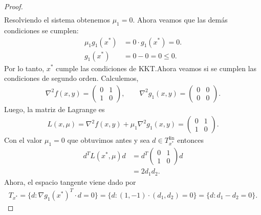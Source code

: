 \documentclass{article}
\begin{document}
\begin{proof}
\begin{align*}
    \end{align*}
    Resolviendo el sistema obtenemos \( \mu_1 = 0 \). Ahora veamos que las demás condiciones se cumplen: \begin{align*}
        \mu_1 g_1(x^*) & = 0 \cdot g_1(x^*) = 0. \\
        g_1(x^*)       & = 0 - 0 = 0 \leq 0.
    \end{align*}
    Por lo tanto, \( x^* \) cumple las condiciones de KKT.\@ Ahora veamos si se cumplen las condiciones de segundo orden. Calculemos, \begin{align*}
        \nabla^2 f(x, y)   = \begin{pmatrix}
                                 0 & 1 \\
                                 1 & 0
                             \end{pmatrix}, \qquad
        \nabla^2 g_1(x, y) = \begin{pmatrix}
                                 0 & 0 \\
                                 0 & 0
                             \end{pmatrix}.
    \end{align*}
    Luego, la matriz de Lagrange es \begin{align*}
        L(x, \mu) = \nabla^2 f(x, y) + \mu_1 \nabla^2 g_1(x, y) = \begin{pmatrix}
                                                                      0 & 1 \\
                                                                      1 & 0
                                                                  \end{pmatrix}.
    \end{align*}
    Con el valor \( \mu_1 = 0 \) que obtuvimos antes y sea \( d \in T^\text{lin}_{x^*} \) entonces \begin{align*}
        d^T L(x^*, \mu) d & = d^T \begin{pmatrix}
                                      0 & 1 \\
                                      1 & 0
                                  \end{pmatrix} d \\
                          & = 2 d_1 d_2.
    \end{align*}
    Ahora, el espacio tangente viene dado por \begin{align*}
        T_{x^*} = \{ d : {\nabla g_1(x^*)}^T \cdot d = 0 \} = \{ d : (1, -1) \cdot (d_1, d_2) = 0 \} = \{ d : d_1 - d_2 = 0 \}.

\end{align*}
\end{proof}
\end{document}
